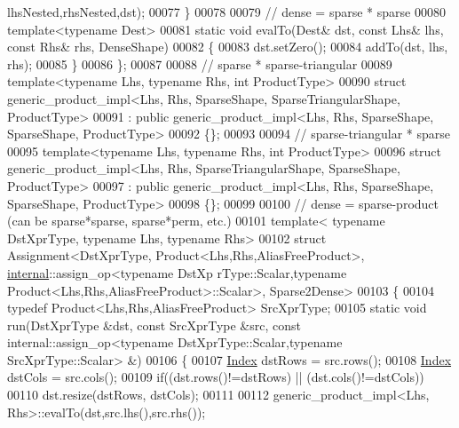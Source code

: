 \begin{DoxyCode}
      lhsNested,rhsNested,dst);
00077   \}
00078 
00079   \textcolor{comment}{// dense = sparse * sparse}
00080   \textcolor{keyword}{template}<\textcolor{keyword}{typename} Dest>
00081   \textcolor{keyword}{static} \textcolor{keywordtype}{void} evalTo(Dest& dst, \textcolor{keyword}{const} Lhs& lhs, \textcolor{keyword}{const} Rhs& rhs, DenseShape)
00082   \{
00083     dst.setZero();
00084     addTo(dst, lhs, rhs);
00085   \}
00086 \};
00087 
00088 \textcolor{comment}{// sparse * sparse-triangular}
00089 \textcolor{keyword}{template}<\textcolor{keyword}{typename} Lhs, \textcolor{keyword}{typename} Rhs, \textcolor{keywordtype}{int} ProductType>
00090 \textcolor{keyword}{struct }generic\_product\_impl<Lhs, Rhs, SparseShape, SparseTriangularShape, ProductType>
00091  : \textcolor{keyword}{public} generic\_product\_impl<Lhs, Rhs, SparseShape, SparseShape, ProductType>
00092 \{\};
00093 
00094 \textcolor{comment}{// sparse-triangular * sparse}
00095 \textcolor{keyword}{template}<\textcolor{keyword}{typename} Lhs, \textcolor{keyword}{typename} Rhs, \textcolor{keywordtype}{int} ProductType>
00096 \textcolor{keyword}{struct }generic\_product\_impl<Lhs, Rhs, SparseTriangularShape, SparseShape, ProductType>
00097  : \textcolor{keyword}{public} generic\_product\_impl<Lhs, Rhs, SparseShape, SparseShape, ProductType>
00098 \{\};
00099 
00100 \textcolor{comment}{// dense = sparse-product (can be sparse*sparse, sparse*perm, etc.)}
00101 \textcolor{keyword}{template}< \textcolor{keyword}{typename} DstXprType, \textcolor{keyword}{typename} Lhs, \textcolor{keyword}{typename} Rhs>
00102 \textcolor{keyword}{struct }Assignment<DstXprType, Product<Lhs,Rhs,AliasFreeProduct>, \hyperlink{namespaceinternal}{internal}::assign\_op<typename DstXp
      rType::Scalar,typename Product<Lhs,Rhs,AliasFreeProduct>::Scalar>, Sparse2Dense>
00103 \{
00104   \textcolor{keyword}{typedef} Product<Lhs,Rhs,AliasFreeProduct> SrcXprType;
00105   \textcolor{keyword}{static} \textcolor{keywordtype}{void} run(DstXprType &dst, \textcolor{keyword}{const} SrcXprType &src, \textcolor{keyword}{const} internal::assign\_op<typename
       DstXprType::Scalar,typename SrcXprType::Scalar> &)
00106   \{
00107     \hyperlink{namespace_eigen_a62e77e0933482dafde8fe197d9a2cfde}{Index} dstRows = src.rows();
00108     \hyperlink{namespace_eigen_a62e77e0933482dafde8fe197d9a2cfde}{Index} dstCols = src.cols();
00109     \textcolor{keywordflow}{if}((dst.rows()!=dstRows) || (dst.cols()!=dstCols))
00110       dst.resize(dstRows, dstCols);
00111     
00112     generic\_product\_impl<Lhs, Rhs>::evalTo(dst,src.lhs(),src.rhs());

\end{DoxyCode}
